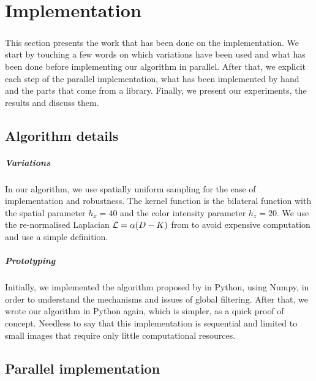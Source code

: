 \chapter{Implementation}

\paragraph{}
This section presents the work that has been done on the implementation.
We start by touching a few words on which variations have been used and what has been done before implementing our algorithm in parallel.
After that, we explicit each step of the parallel implementation, what has been implemented by hand and the parts that come from a library.
Finally, we present our experiments, the results and discuss them.

\section{Algorithm details}

\paragraph{Variations}
In our algorithm, we use spatially uniform sampling for the ease of implementation and robustness.
The kernel function is the bilateral function with the spatial parameter \(h_x = 40\) and the color intensity parameter \(h_z = 20\).
We use the re-normalised Laplacian \(\operatorname{\mathcal{L}} = \alpha (D-K)\) from \cite{milanfar_new_2016} to avoid expensive computation and use a simple definition.

\paragraph{Prototyping}
Initially, we implemented the algorithm proposed by \cite{glide_2014} in Python, using Numpy, in order to understand the mechanisms and issues of global filtering.
After that, we wrote our algorithm in Python again, which is simpler, as a quick proof of concept.
Needless to say that this implementation is sequential and limited to small images that require only little computational resources.

\section{Parallel implementation}

